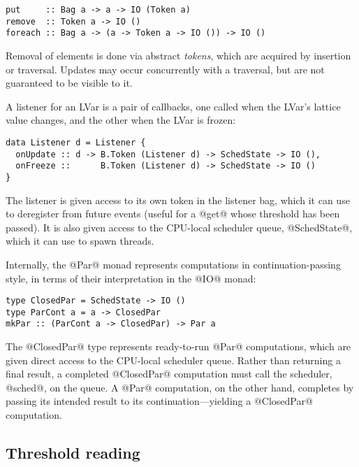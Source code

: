 \singlespacing
\begin{lstlisting}
put     :: Bag a -> a -> IO (Token a)
remove  :: Token a -> IO ()
foreach :: Bag a -> (a -> Token a -> IO ()) -> IO ()
\end{lstlisting}
\doublespacing

\noindent Removal of elements is done via abstract \emph{tokens},
which are acquired by insertion or traversal.  Updates may occur
concurrently with a traversal, but are not guaranteed to be visible to
it.

A listener for an LVar is a pair of callbacks, one called when the
LVar's lattice value changes, and the other when the LVar is frozen:

\singlespacing
\begin{lstlisting}
data Listener d = Listener {
  onUpdate :: d -> B.Token (Listener d) -> SchedState -> IO (),
  onFreeze ::      B.Token (Listener d) -> SchedState -> IO ()
}
\end{lstlisting}
\doublespacing

\noindent The listener is given access to its own token in the
listener bag, which it can use to deregister from future events
(useful for a @get@ whose threshold has been passed).  It is also
given access to the CPU-local scheduler queue, @SchedState@, which it
can use to spawn threads.

Internally, the @Par@ monad represents computations in
continuation-passing style, in terms of their interpretation in the
@IO@ monad:

\singlespacing
\begin{lstlisting}
type ClosedPar = SchedState -> IO ()
type ParCont a = a -> ClosedPar
mkPar :: (ParCont a -> ClosedPar) -> Par a
\end{lstlisting}
\doublespacing

\noindent The @ClosedPar@ type represents ready-to-run @Par@
computations, which are given direct access to the CPU-local scheduler
queue.  Rather than returning a final result, a completed @ClosedPar@
computation must call the scheduler, @sched@, on the queue.  A @Par@
computation, on the other hand, completes by passing its intended
result to its continuation---yielding a @ClosedPar@ computation.

\subsection{Threshold reading}

